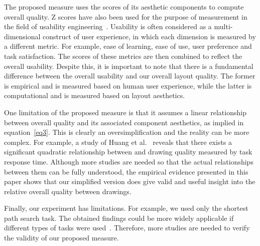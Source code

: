 \documentclass[conference,letterpaper]{IEEEtran}
\begin{document}
The proposed measure uses the  scores of its aesthetic components to compute overall quality. Z scores have also been used for the purpose of measurement in the field of usability engineering~\cite{tullis08}. Usability is often considered as a multi-dimensional construct of user experience, in which each dimension is measured by a different metric. For example, ease of learning, ease of use, user preference and task satisfaction. The  scores of these metrics are then combined to reflect the overall usability. Despite this, it is important to note that there is a fundamental difference between the overall usability and our overall layout quality. The former is empirical and is measured based on human user experience, while the latter is computational and is measured based on layout aesthetics.

One limitation of the proposed measure is that it assumes a linear relationship between overall quality and its associated component aesthetics, as implied in equation~\ref{eq3}.  This is clearly \newpage \noindent an  oversimplification and the reality can be more complex. For example, a study of Huang et al.~\cite{huang08} reveals that there exists a significant quadratic relationship between  and drawing quality measured by task response time. Although more studies are needed so that the actual relationships between them can be fully understood, the empirical evidence presented in this paper shows that our simplified version does give valid and useful insight into the relative overall quality between drawings.

Finally, our experiment has limitations. For example, we used only the shortest path search task. The obtained findings could be more widely applicable if different types of tasks were used~\cite{lee06}. Therefore, more studies are needed to verify the validity of our proposed measure. 
\end{document}
